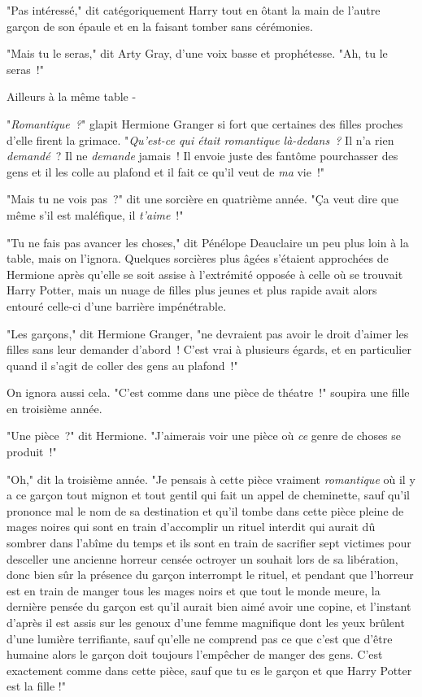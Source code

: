 "Pas intéressé," dit catégoriquement Harry tout en ôtant la main de l'autre garçon de son épaule et en la faisant tomber sans cérémonies.

"Mais tu le seras," dit Arty Gray, d'une voix basse et prophétesse. "Ah, tu le seras~!"

Ailleurs à la même table -

"\emph{Romantique~?}" glapit Hermione Granger si fort que certaines des filles proches d'elle firent la grimace. "\emph{Qu'est-ce qui était romantique là-dedans~?} Il n'a rien \emph{demandé}~? Il ne \emph{demande} jamais~! Il envoie juste des fantôme pourchasser des gens et il les colle au plafond et il fait ce qu'il veut de \emph{ma} vie~!"

"Mais tu ne vois pas~?" dit une sorcière en quatrième année. "Ça veut dire que même s'il est maléfique, il \emph{t'aime}~!"

"Tu ne fais pas avancer les choses," dit Pénélope Deauclaire un peu plus loin à la table, mais on l'ignora. Quelques sorcières plus âgées s'étaient approchées de Hermione après qu'elle se soit assise à l'extrémité opposée à celle où se trouvait Harry Potter, mais un nuage de filles plus jeunes et plus rapide avait alors entouré celle-ci d'une barrière impénétrable.

"Les garçons," dit Hermione Granger, "ne devraient pas avoir le droit d'aimer les filles sans leur demander d'abord~! C'est vrai à plusieurs égards, et en particulier quand il s'agit de coller des gens au plafond~!"

On ignora aussi cela. "C'est comme dans une pièce de théatre~!" soupira une fille en troisième année.

"Une pièce~?" dit Hermione. "J'aimerais voir une pièce où \emph{ce} genre de choses se produit~!"

"Oh," dit la troisième année. "Je pensais à cette pièce vraiment \emph{romantique} où il y a ce garçon tout mignon et tout gentil qui fait un appel de cheminette, sauf qu'il prononce mal le nom de sa destination et qu'il tombe dans cette pièce pleine de mages noires qui sont en train d'accomplir un rituel interdit qui aurait dû sombrer dans l'abîme du temps et ils sont en train de sacrifier sept victimes pour desceller une ancienne horreur censée octroyer un souhait lors de sa libération, donc bien sûr la présence du garçon interrompt le rituel, et pendant que l'horreur est en train de manger tous les mages noirs et que tout le monde meure, la dernière pensée du garçon est qu'il aurait bien aimé avoir une copine, et l'instant d'après il est assis sur les genoux d'une femme magnifique dont les yeux brûlent d'une lumière terrifiante, sauf qu'elle ne comprend pas ce que c'est que d'être humaine alors le garçon doit toujours l'empêcher de manger des gens. C'est exactement comme dans cette pièce, sauf que tu es le garçon et que Harry Potter est la fille !"

